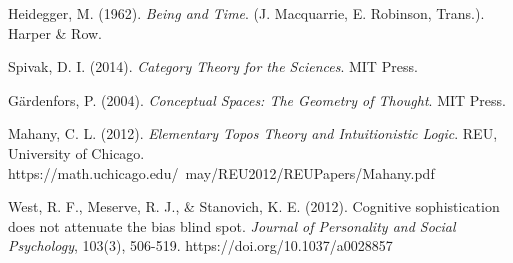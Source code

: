 \documentclass{article}
\begin{document}
\begin{thebibliography}{9}
     Heidegger, M. (1962). \textit{Being and Time}. (J. Macquarrie, E. Robinson, Trans.). Harper \& Row.

    Spivak, D. I. (2014). \textit{Category Theory for the Sciences}. MIT Press.

    Gärdenfors, P. (2004). \textit{Conceptual Spaces: The Geometry of Thought}. MIT Press.

    Mahany, C. L. (2012). \textit{Elementary Topos Theory and Intuitionistic Logic}. REU, University of Chicago. https://math.uchicago.edu/~may/REU2012/REUPapers/Mahany.pdf

    West, R. F., Meserve, R. J., \& Stanovich, K. E. (2012). Cognitive sophistication does not attenuate the bias blind spot. \textit{Journal of Personality and Social Psychology}, 103(3), 506-519. https://doi.org/10.1037/a0028857

\end{thebibliography}
\end{document}

